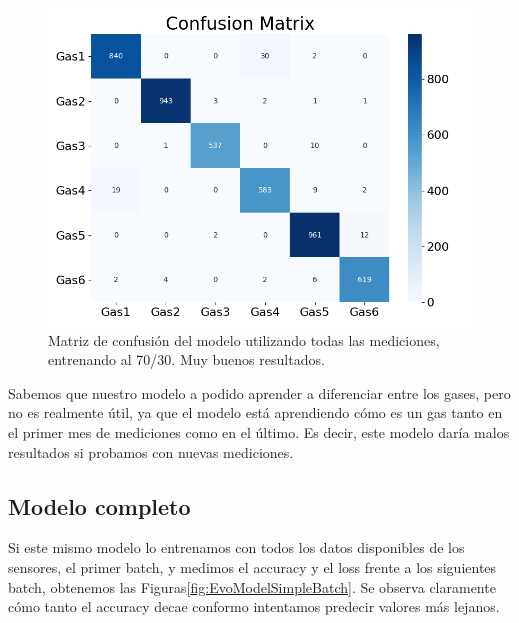 \begin{figure}
	\centering
	\includegraphics[width=0.7\linewidth]{../py_imgs/ConfMatrix_ModelSimple}
	\caption{Matriz de confusión del modelo utilizando todas las mediciones, entrenando al 70/30. Muy buenos resultados.}
	\label{fig:confmatrixmodelsimple}
\end{figure}

Sabemos que nuestro modelo a podido aprender a diferenciar entre los gases, pero no es realmente útil, ya que el modelo está aprendiendo cómo es un gas tanto en el primer mes de mediciones como en el último. Es decir, este modelo daría malos resultados si probamos con nuevas mediciones.

\subsection{Modelo completo}


Si este mismo modelo lo entrenamos con todos los datos disponibles de los sensores, el primer batch, y medimos el accuracy y el loss frente a los siguientes batch, obtenemos las Figuras\ref{fig:EvoModelSimpleBatch}. Se observa claramente cómo tanto el accuracy decae conformo intentamos predecir valores más lejanos. 

